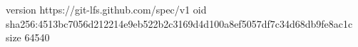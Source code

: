 version https://git-lfs.github.com/spec/v1
oid sha256:4513bc7056d212214e9eb522b2c3169d4d100a8ef5057df7c34d68db9fe8ac1c
size 64540
